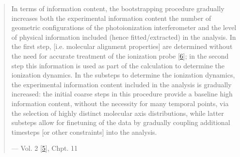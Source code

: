 \documentclass[letterpaper,table,10pt,english]{jupyterBook}
\begin{document}
\begin{quote}
\sphinxAtStartPar
In terms of information content, the bootstrapping procedure gradually increases both the experimental information content \sphinxhyphen{} the number of geometric configurations of the photoionization interferometer \sphinxhyphen{} and the level of physical information included (hence fitted/extracted) in the analysis. In the first step, {\hyperref[\detokenize{backmatter/glossary:term-ADMs}]{}} {[}i.e. molecular alignment properties{]} are determined without the need for accurate treatment of the ionization probe {[}\hyperlink{cite.backmatter/bibliography:id756}{6}{]}; in the second step this information is used as part of the calculation to determine the ionization dynamics. In the sub\sphinxhyphen{}steps to determine the ionization dynamics, the experimental information content included in the analysis is gradually increased: the initial coarse steps in this procedure provide a base\sphinxhyphen{}line high information content, without the necessity for many temporal points, via the selection of highly distinct molecular axis distributions, while latter sub\sphinxhyphen{}steps allow for fine\sphinxhyphen{}tuning of the data by gradually coupling additional time\sphinxhyphen{}steps {[}or other constraints{]} into the analysis.

\begin{flushright}
--- Vol. 2 {[}\hyperlink{cite.backmatter/bibliography:id664}{5}{]}, Chpt. 11
\end{flushright}
\end{quote}
\end{document}
